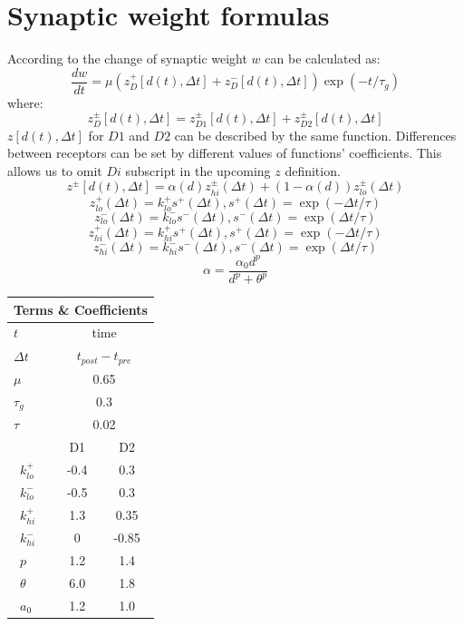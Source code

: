 \documentclass[twoside,twocolumn]{article}
\begin{document}
\section{Synaptic weight formulas}
\begin{strip}
According to \cite[p.~20]{gurney_new_2015} the change of synaptic weight $w$ can be calculated as:
\[ \frac{dw}{dt} = \mu(z^{+}_{D}[d(t),\Delta t] + z^{-}_{D}[d(t),\Delta t])\exp(-t/\tau_{g}) \]
where:
\[ z^{\pm}_{D}[d(t),\Delta t] = z^{\pm}_{D1}[d(t),\Delta t] + z^{\pm}_{D2}[d(t),\Delta t]\]
$z[d(t),\Delta t]$ for $D1$ and $D2$ can be described by the same function. Differences between receptors can be set by different values of functions' coefficients. This allows us to omit $Di$ subscript in the upcoming $z$ definition.
\[ z^{\pm}[d(t),\Delta t] = \alpha(d)z^{\pm}_{hi}(\Delta t) + (1 - \alpha(d))z^{\pm}_{lo}(\Delta t) \]
\[ z^{+}_{lo}(\Delta t) = k^{+}_{lo}s^{+}(\Delta t) , s^{+}(\Delta t) = \exp(-\Delta t/\tau) \]
\[ z^{-}_{lo}(\Delta t) = k^{-}_{lo}s^{-}(\Delta t) , s^{-}(\Delta t) = \exp(\Delta t/\tau) \]
\[ z^{+}_{hi}(\Delta t) = k^{+}_{hi}s^{+}(\Delta t) , s^{+}(\Delta t) = \exp(-\Delta t/\tau) \]
\[ z^{-}_{hi}(\Delta t) = k^{-}_{hi}s^{-}(\Delta t) , s^{-}(\Delta t) = \exp(\Delta t/\tau) \]
\[ \alpha = \frac{\alpha_{0}d^{p}}{d^{p} + \theta^{p}} \]
\begin{tabular}{|l|*{2}{c|}}
  \hline
   \multicolumn{3}{|c|}{Terms \& Coefficients} \\ \hline
   $t$ & \multicolumn{2}{|c|}{time} \\ \hline
   $\Delta t$ & \multicolumn{2}{|c|}{$t_{post}-t_{pre}$} \\ \hline   
   $\mu$ & \multicolumn{2}{|c|}{0.65} \\ \hline
   $\tau_{g}$ & \multicolumn{2}{|c|}{0.3} \\ \hline
   $\tau$ & \multicolumn{2}{|c|}{0.02} \\ \hline
   \ & D1&D2 \\ \hline
   \ $k^{+}_{lo}$ & -0.4 & 0.3 \\ \hline
   \ $k^{-}_{lo}$ & -0.5 & 0.3 \\ \hline
   \ $k^{+}_{hi}$ & 1.3 & 0.35 \\ \hline
   \ $k^{-}_{hi}$ & 0 & -0.85 \\ \hline
   \ $p$ & 1.2 & 1.4 \\ \hline
   \ $\theta$ & 6.0 & 1.8 \\ \hline
   \ $a_{0}$ & 1.2 & 1.0 \\ \hline
\end{tabular}
\end{strip}
\end{document}
